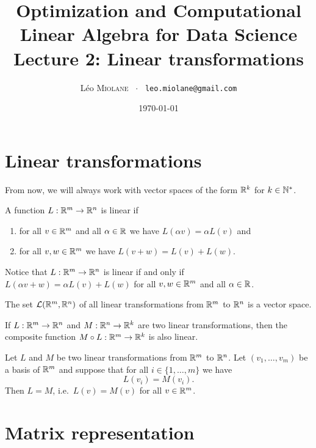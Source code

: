 \documentclass[11pt,nocut]{article}
\title{\vspace{-2.0cm}%
	Optimization and Computational Linear Algebra for Data Science\\
	Lecture 2: Linear transformations}
\author{Léo \textsc{Miolane} \ $\cdot$ \ \texttt{leo.miolane@gmail.com}}
\date{\today}
\begin{document}
\maketitle

\section{Linear transformations}

\begin{center}
From now, we will always work with vector spaces of the form $\mathbb{R}^k$ for $k \in \mathbb{N}^*$.
\end{center}
\vspace{1mm}

\begin{definition}
	A function $L: \mathbb{R}^m \to \mathbb{R}^n$ is linear if
	\begin{enumerate}[label=(\roman*)]
		\item for all $v \in \mathbb{R}^m$ and all $\alpha \in \mathbb{R}$ we have $L(\alpha v) = \alpha L(v)$ and
		\item for all $v,w \in \mathbb{R}^m$ we have $L(v + w) = L(v) + L(w)$.
	\end{enumerate}
\end{definition}

Notice that $L: \mathbb{R}^m \to \mathbb{R}^n$ is linear if and only if $L(\alpha v + w) = \alpha L(v) + L(w)$ for all $v,w \in \mathbb{R}^m$ and all $\alpha \in \mathbb{R}$.

\begin{proposition}
	The set $\mathcal{L}(\mathbb{R}^m, \mathbb{R}^n)$ of all linear transformations from $\mathbb{R}^m$ to $\mathbb{R}^n$ is a vector space.
\end{proposition}

\begin{proposition}
	If $L: \mathbb{R}^m \to \mathbb{R}^n$ and $M: \mathbb{R}^n \to \mathbb{R}^k$ are two linear transformations, then the composite function $M \circ L: \mathbb{R}^m \to \mathbb{R}^k$ is also linear.
\end{proposition}

\begin{theorem}\label{th:basis_cara}
	Let $L$ and $M$ be two linear transformations from $\mathbb{R}^m$ to $\mathbb{R}^n$.
	Let $(v_1, \dots, v_m)$ be a basis of $\mathbb{R}^m$ and suppose that for all $i \in \{1, \dots,m\}$ we have
	$$
	L(v_i) = M(v_i).
	$$
	Then $L = M$, i.e.\ $L(v) = M(v)$ for all $v \in \mathbb{R}^m$.
\end{theorem}

\section{Matrix representation}
\end{document}
